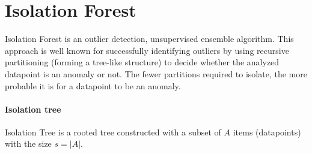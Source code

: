\section{Isolation Forest}
\label{sec:isolation_forest}

Isolation Forest
\cite{liu2008isolation} \cite{liu2012isolation} is an outlier
detection, unsupervised ensemble algorithm. This approach is well known for successfully identifying outliers by using recursive partitioning (forming a tree-like structure) to decide whether the analyzed datapoint is an anomaly or not. The fewer partitions required to isolate, the more probable it is for a datapoint to be an anomaly.

\paragraph{Isolation tree}
Isolation Tree is a rooted tree constructed with a subset of \(A\) items
(datapoints) with the size \(s=|A|\).

